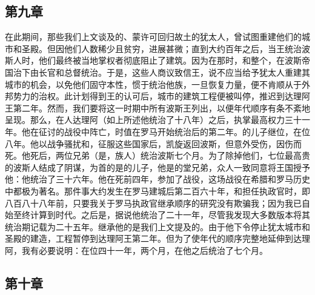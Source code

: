 
\subsection{第九章}

在此期间，那些我们上文谈及的、蒙许可回归故土的犹太人，曾试图重建他们的城市和圣殿。但因他们人数稀少且贫穷，进展甚微；直到大约百年之后，当王统治波斯人时，他们最终被当地掌权者彻底阻止了建筑。因为在那时，和整个，在波斯帝国治下由长官和总督统治。于是，这些人商议致信王，说不应当给予犹太人重建其城市的机会，以免他们固守本性，惯于统治他族，一旦恢复力量，便不肯顺从于外邦势力的治权。此计划得到王的认可后，城市的建筑工程便被叫停，推迟到达理阿王第二年。然而，我们要将这一时期中所有波斯王列出，以便年代顺序有条不紊地呈现。那么，在人达理阿（如上所述他统治了十八年）之后，执掌最高权力三十一年。他在征讨的战役中阵亡，时值在罗马开始统治后的第二年。的儿子继位，在位八年。他以战争骚扰和，征服这些国家后，凯旋返回波斯，但意外受伤，因伤而死。他死后，两位兄弟（是，族人）统治波斯七个月。为了除掉他们，七位最高贵的波斯人结成了阴谋，为首的是的儿子，他是的堂兄弟，众人一致同意将王国授予他：他统治了三十六年。他在死前四年，参加了战役，这场战役在希腊和罗马历史中都极为著名。那件事大约发生在罗马建城后第二百六十年，和担任执政官时，即八百八十八年前，只要我关于罗马执政官继承顺序的研究没有欺骗我；因为我已自始至终计算到时代。之后是，据说他统治了二十一年，尽管我发现大多数版本将其统治期记载为二十五年。继承他的是我们上文提及的。由于他下令停止犹太城市和圣殿的建造，工程暂停到达理阿王第二年。但为了使年代的顺序完整地延伸到达理阿，我有必要说明：在位四十一年，两个月，在他之后统治了七个月。\par


\subsection{第十章}

